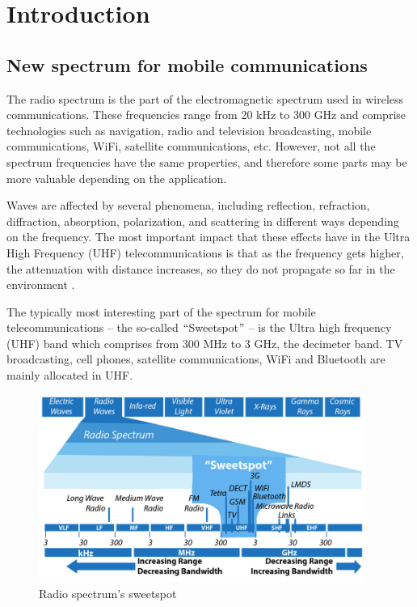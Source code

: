 \chapter{Introduction}
\section{New spectrum for mobile communications}
The radio spectrum is the part of the electromagnetic spectrum used in wireless communications. These frequencies range from 20 kHz to 300 GHz and comprise technologies such as navigation, radio and television broadcasting, mobile communications, WiFi, satellite communications, etc. However, not all the spectrum frequencies have the same properties, and therefore some parts may be more valuable depending on the application.\par

Waves are affected by several phenomena, including reflection, refraction, diffraction, absorption, polarization, and scattering in different ways depending on the frequency. The most important impact that these effects have in the Ultra High Frequency (UHF) telecommunications is that as the frequency gets higher, the attenuation with distance increases, so they do not propagate so far in the environment \cite{1-01}.\par

The typically most interesting part of the spectrum for mobile telecommunications – the so-called $``$Sweetspot$"$  – is the Ultra high frequency (UHF) band which comprises from 300 MHz to 3 GHz, the decimeter band. TV broadcasting, cell phones, satellite communications, WiFi and Bluetooth are mainly allocated in UHF.


\begin{figure}[H]
	\begin{Center}
		\includegraphics[width=0.95\textwidth]{./media/image1.jpeg}
		\caption{Radio spectrum's sweetspot \cite{1-34}}
	\end{Center}
\end{figure}

